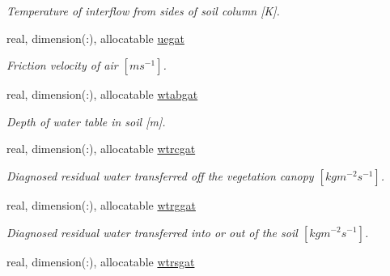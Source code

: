 \begin{DoxyCompactItemize}
\begin{DoxyCompactList}\small\item\em Temperature of interflow from sides of soil column \mbox{[}K\mbox{]}. \end{DoxyCompactList}\item 
\hypertarget{structclass__statevars_1_1class__gather_a5dc087d0e4bf2ba5725c2eb07e9f3307}{}real, dimension(\+:), allocatable \hyperlink{structclass__statevars_1_1class__gather_a5dc087d0e4bf2ba5725c2eb07e9f3307}{uegat}\label{structclass__statevars_1_1class__gather_a5dc087d0e4bf2ba5725c2eb07e9f3307}

\begin{DoxyCompactList}\small\item\em Friction velocity of air $[m s^{-1} ]$. \end{DoxyCompactList}\item 
\hypertarget{structclass__statevars_1_1class__gather_ace80e54c3cb5dde3c04ac573ddf92575}{}real, dimension(\+:), allocatable \hyperlink{structclass__statevars_1_1class__gather_ace80e54c3cb5dde3c04ac573ddf92575}{wtabgat}\label{structclass__statevars_1_1class__gather_ace80e54c3cb5dde3c04ac573ddf92575}

\begin{DoxyCompactList}\small\item\em Depth of water table in soil \mbox{[}m\mbox{]}. \end{DoxyCompactList}\item 
\hypertarget{structclass__statevars_1_1class__gather_adefbe29d8ccffad03dcd9538bf31879c}{}real, dimension(\+:), allocatable \hyperlink{structclass__statevars_1_1class__gather_adefbe29d8ccffad03dcd9538bf31879c}{wtrcgat}\label{structclass__statevars_1_1class__gather_adefbe29d8ccffad03dcd9538bf31879c}

\begin{DoxyCompactList}\small\item\em Diagnosed residual water transferred off the vegetation canopy $[kg m^{-2} s^{-1} ]$. \end{DoxyCompactList}\item 
\hypertarget{structclass__statevars_1_1class__gather_aaa021124b08fd696187f748f4ed2794c}{}real, dimension(\+:), allocatable \hyperlink{structclass__statevars_1_1class__gather_aaa021124b08fd696187f748f4ed2794c}{wtrggat}\label{structclass__statevars_1_1class__gather_aaa021124b08fd696187f748f4ed2794c}

\begin{DoxyCompactList}\small\item\em Diagnosed residual water transferred into or out of the soil $[kg m^{-2} s^{-1} ]$. \end{DoxyCompactList}\item 
\hypertarget{structclass__statevars_1_1class__gather_a8e2398a6b1b92158acd853f4737ce3bf}{}real, dimension(\+:), allocatable \hyperlink{structclass__statevars_1_1class__gather_a8e2398a6b1b92158acd853f4737ce3bf}{wtrsgat}\label{structclass__statevars_1_1class__gather_a8e2398a6b1b92158acd853f4737ce3bf}


\end{DoxyCompactItemize}
